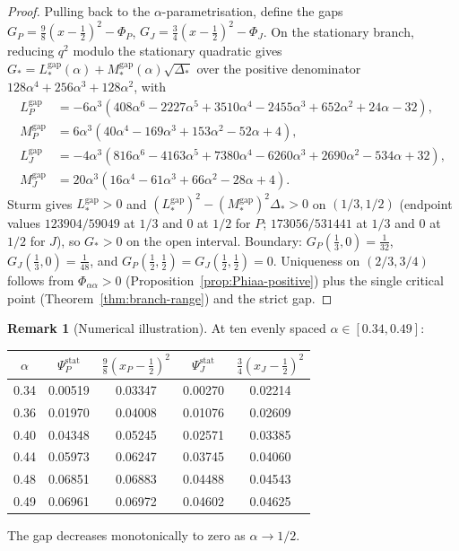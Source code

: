\documentclass[11pt]{amsart}
\theoremstyle{definition}
\newtheorem{remark}[theorem]{Remark}
\newcommand{\1}{\mathbf 1}
\begin{document}
\begin{proof}
Pulling back to the $\alpha$-parametrisation, define the gaps
$G_P=\tfrac98(x-\tfrac12)^2-\Phi_P$, $G_J=\tfrac34(x-\tfrac12)^2-\Phi_J$.  On the
stationary branch, reducing $q^2$ modulo the stationary quadratic gives
$G_*=L_*^{\mathrm{gap}}(\alpha)+M_*^{\mathrm{gap}}(\alpha)\sqrt{\Delta_*}$ over the
positive denominator $128\alpha^4+256\alpha^3+128\alpha^2$, with
\begin{align*}
L_P^{\mathrm{gap}} &= -6\alpha^3(408\alpha^6 - 2227\alpha^5 + 3510\alpha^4 - 2455\alpha^3 + 652\alpha^2 + 24\alpha - 32),
\\
M_P^{\mathrm{gap}} &= 6\alpha^3(40\alpha^4 - 169\alpha^3 + 153\alpha^2 - 52\alpha + 4),
\\
L_J^{\mathrm{gap}} &= -4\alpha^3(816\alpha^6 - 4163\alpha^5 + 7380\alpha^4 - 6260\alpha^3 + 2690\alpha^2 - 534\alpha + 32),
\\
M_J^{\mathrm{gap}} &= 20\alpha^3(16\alpha^4 - 61\alpha^3 + 66\alpha^2 - 28\alpha + 4).
\end{align*}
Sturm gives $L_*^{\mathrm{gap}}>0$ and
$(L_*^{\mathrm{gap}})^2-(M_*^{\mathrm{gap}})^2\Delta_*>0$ on $(1/3,1/2)$ (endpoint
values $123904/59049$ at $1/3$ and $0$ at $1/2$ for $P$; $173056/531441$ at $1/3$
and $0$ at $1/2$ for $J$), so $G_*>0$ on the open interval.  Boundary:
$G_P(\tfrac13,0)=\tfrac1{32}$, $G_J(\tfrac13,0)=\tfrac1{48}$, and
$G_P(\tfrac12,\tfrac12)=G_J(\tfrac12,\tfrac12)=0$.  Uniqueness on $(2/3,3/4)$
follows from $\Phi_{\alpha\alpha}>0$ (Proposition~\ref{prop:Phiaa-positive}) plus
the single critical point (Theorem~\ref{thm:branch-range}) and the strict gap.
\end{proof}

\begin{remark}[Numerical illustration]
At ten evenly spaced $\alpha\in[0.34,0.49]$:
\begin{center}
\begin{tabular}{c||c|c||c|c}
$\alpha$ & $\Psi_P^{\text{stat}}$ & $\tfrac98(x_P-\tfrac12)^2$
         & $\Psi_J^{\text{stat}}$ & $\tfrac34(x_J-\tfrac12)^2$ \\ \hline
0.34 & 0.00519 & 0.03347 & 0.00270 & 0.02214 \\
0.36 & 0.01970 & 0.04008 & 0.01076 & 0.02609 \\
0.40 & 0.04348 & 0.05245 & 0.02571 & 0.03385 \\
0.44 & 0.05973 & 0.06247 & 0.03745 & 0.04060 \\
0.48 & 0.06851 & 0.06883 & 0.04488 & 0.04543 \\
0.49 & 0.06961 & 0.06972 & 0.04602 & 0.04625
\end{tabular}
\end{center}
The gap decreases monotonically to zero as $\alpha\to 1/2$.
\end{remark}
\end{document}
